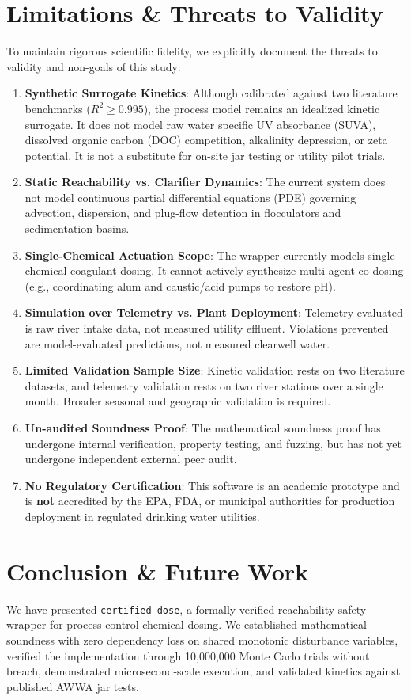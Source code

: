 \documentclass[10pt,twocolumn,letterpaper]{article}
\theoremstyle{definition}
\begin{document}
\section{Limitations \& Threats to Validity}
To maintain rigorous scientific fidelity, we explicitly document the threats to validity and non-goals of this study:
\begin{enumerate}
    \item \textbf{Synthetic Surrogate Kinetics}: Although calibrated against two literature benchmarks ($R^2 \ge 0.995$), the process model remains an idealized kinetic surrogate. It does not model raw water specific UV absorbance (SUVA), dissolved organic carbon (DOC) competition, alkalinity depression, or zeta potential. It is not a substitute for on-site jar testing or utility pilot trials.
    \item \textbf{Static Reachability vs. Clarifier Dynamics}: The current system does not model continuous partial differential equations (PDE) governing advection, dispersion, and plug-flow detention in flocculators and sedimentation basins.
    \item \textbf{Single-Chemical Actuation Scope}: The wrapper currently models single-chemical coagulant dosing. It cannot actively synthesize multi-agent co-dosing (e.g., coordinating alum and caustic/acid pumps to restore pH).
    \item \textbf{Simulation over Telemetry vs. Plant Deployment}: Telemetry evaluated is raw river intake data, not measured utility effluent. Violations prevented are model-evaluated predictions, not measured clearwell water.
    \item \textbf{Limited Validation Sample Size}: Kinetic validation rests on two literature datasets, and telemetry validation rests on two river stations over a single month. Broader seasonal and geographic validation is required.
    \item \textbf{Un-audited Soundness Proof}: The mathematical soundness proof has undergone internal verification, property testing, and fuzzing, but has not yet undergone independent external peer audit.
    \item \textbf{No Regulatory Certification}: This software is an academic prototype and is \textbf{not} accredited by the EPA, FDA, or municipal authorities for production deployment in regulated drinking water utilities.
\end{enumerate}

\section{Conclusion \& Future Work}
We have presented \texttt{certified-dose}, a formally verified reachability safety wrapper for process-control chemical dosing. We established mathematical soundness with zero dependency loss on shared monotonic disturbance variables, verified the implementation through 10,000,000 Monte Carlo trials without breach, demonstrated microsecond-scale execution, and validated kinetics against published AWWA jar tests. 
\end{document}
